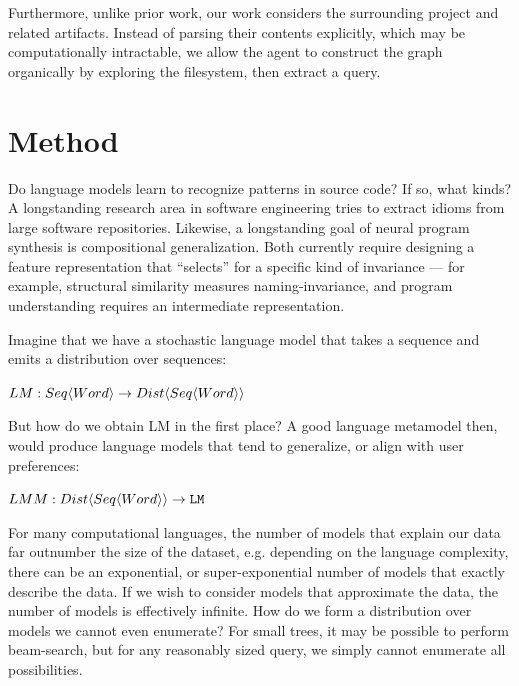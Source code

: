 \documentclass[sigconf]{acmart}
\begin{document}
  Furthermore, unlike prior work, our work considers the surrounding project and related artifacts. Instead of parsing their contents explicitly, which may be computationally intractable, we allow the agent to construct the graph organically by exploring the filesystem, then extract a query.

  \section{Method}\label{sec:method}

  Do language models learn to recognize patterns in source code? If so, what kinds? A longstanding research area in software engineering tries to extract idioms from large software repositories. Likewise, a longstanding goal of neural program synthesis is compositional generalization. Both currently require designing a feature representation that “selects” for a specific kind of invariance — for example, structural similarity measures naming-invariance, and program understanding requires an intermediate representation.






  Imagine that we have a stochastic language model that takes a sequence and emits a distribution over sequences:

  $LM: Seq \langle Word \rangle  \rightarrow Dist\langle Seq \langle Word \rangle \rangle $

  But how do we obtain LM in the first place? A good language metamodel then, would produce language models that tend to generalize, or align with user preferences:

  $LMM: Dist\langle Seq \langle Word \rangle \rangle \rightarrow \texttt{LM}$

  For many computational languages, the number of models that explain our data far outnumber the size of the dataset, e.g. depending on the language complexity, there can be an exponential, or super-exponential number of models that exactly describe the data. If we wish to consider models that approximate the data, the number of models is effectively infinite. How do we form a distribution over models we cannot even enumerate? For small trees, it may be possible to perform beam-search, but for any reasonably sized query, we simply cannot enumerate all possibilities.
\end{document}
